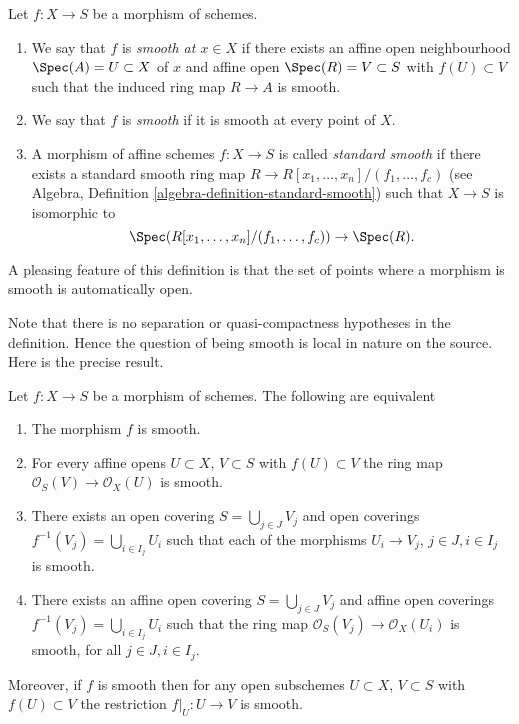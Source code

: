\begin{definition}
\label{definition-smooth}
Let $f : X \to S$ be a morphism of schemes.
\begin{enumerate}
\item We say that $f$ is {\it smooth at $x \in X$} if
there exists an affine open neighbourhood $\Spec(A) = U \subset X$
of $x$ and affine open $\Spec(R) = V \subset S$
with $f(U) \subset V$ such that the induced ring map
$R \to A$ is smooth.
\item We say that $f$ is {\it smooth} if it is smooth at every point of $X$.
\item A morphism of affine schemes $f : X \to S$
is called {\it standard smooth} if there exists a standard smooth ring
map $R \to R[x_1, \ldots, x_n]/(f_1, \ldots, f_c)$ (see
Algebra, Definition \ref{algebra-definition-standard-smooth})
such that $X \to S$ is isomorphic to
$$
\Spec(R[x_1, \ldots, x_n]/(f_1, \ldots, f_c)) \to \Spec(R).
$$
\end{enumerate}
\end{definition}

\noindent
A pleasing feature of this definition is that the set of points
where a morphism is smooth is automatically open.

\medskip\noindent
Note that there is no separation or quasi-compactness hypotheses in the
definition. Hence the question of being smooth is local in nature on
the source. Here is the precise result.

\begin{lemma}
\label{lemma-smooth-characterize}
Let $f : X \to S$ be a morphism of schemes.
The following are equivalent
\begin{enumerate}
\item The morphism $f$ is smooth.
\item For every affine opens $U \subset X$, $V \subset S$
with $f(U) \subset V$ the ring map
$\mathcal{O}_S(V) \to \mathcal{O}_X(U)$ is smooth.
\item There exists an open covering $S = \bigcup_{j \in J} V_j$
and open coverings $f^{-1}(V_j) = \bigcup_{i \in I_j} U_i$ such
that each of the morphisms $U_i \to V_j$, $j\in J, i\in I_j$
is smooth.
\item There exists an affine open covering $S = \bigcup_{j \in J} V_j$
and affine open coverings $f^{-1}(V_j) = \bigcup_{i \in I_j} U_i$ such
that the ring map $\mathcal{O}_S(V_j) \to \mathcal{O}_X(U_i)$ is
smooth, for all $j\in J, i\in I_j$.
\end{enumerate}
Moreover, if $f$ is smooth then for
any open subschemes $U \subset X$, $V \subset S$ with $f(U) \subset V$
the restriction $f|_U : U \to V$ is smooth.
\end{lemma}

